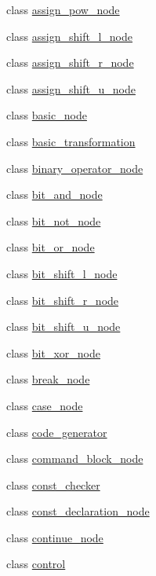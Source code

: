 \begin{DoxyCompactItemize}
class \hyperlink{classjawe_1_1assign__pow__node}{assign\+\_\+pow\+\_\+node}
\item 
class \hyperlink{classjawe_1_1assign__shift__l__node}{assign\+\_\+shift\+\_\+l\+\_\+node}
\item 
class \hyperlink{classjawe_1_1assign__shift__r__node}{assign\+\_\+shift\+\_\+r\+\_\+node}
\item 
class \hyperlink{classjawe_1_1assign__shift__u__node}{assign\+\_\+shift\+\_\+u\+\_\+node}
\item 
class \hyperlink{classjawe_1_1basic__node}{basic\+\_\+node}
\item 
class \hyperlink{classjawe_1_1basic__transformation}{basic\+\_\+transformation}
\item 
class \hyperlink{classjawe_1_1binary__operator__node}{binary\+\_\+operator\+\_\+node}
\item 
class \hyperlink{classjawe_1_1bit__and__node}{bit\+\_\+and\+\_\+node}
\item 
class \hyperlink{classjawe_1_1bit__not__node}{bit\+\_\+not\+\_\+node}
\item 
class \hyperlink{classjawe_1_1bit__or__node}{bit\+\_\+or\+\_\+node}
\item 
class \hyperlink{classjawe_1_1bit__shift__l__node}{bit\+\_\+shift\+\_\+l\+\_\+node}
\item 
class \hyperlink{classjawe_1_1bit__shift__r__node}{bit\+\_\+shift\+\_\+r\+\_\+node}
\item 
class \hyperlink{classjawe_1_1bit__shift__u__node}{bit\+\_\+shift\+\_\+u\+\_\+node}
\item 
class \hyperlink{classjawe_1_1bit__xor__node}{bit\+\_\+xor\+\_\+node}
\item 
class \hyperlink{classjawe_1_1break__node}{break\+\_\+node}
\item 
class \hyperlink{classjawe_1_1case__node}{case\+\_\+node}
\item 
class \hyperlink{classjawe_1_1code__generator}{code\+\_\+generator}
\item 
class \hyperlink{classjawe_1_1command__block__node}{command\+\_\+block\+\_\+node}
\item 
class \hyperlink{classjawe_1_1const__checker}{const\+\_\+checker}
\item 
class \hyperlink{classjawe_1_1const__declaration__node}{const\+\_\+declaration\+\_\+node}
\item 
class \hyperlink{classjawe_1_1continue__node}{continue\+\_\+node}
\item 
class \hyperlink{classjawe_1_1control}{control}

\end{DoxyCompactItemize}
